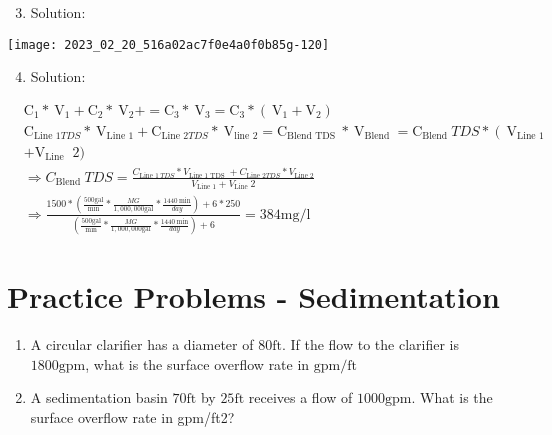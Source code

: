 \documentclass[10pt]{article}
\begin{document}
\begin{enumerate}
\begin{enumerate}
\begin{enumerate}
  \setcounter{enumi}{2}
  \item Solution:
\end{enumerate}

\begin{center}
\texttt{[image: 2023\_02\_20\_516a02ac7f0e4a0f0b85g-120]}
\end{center}

\begin{enumerate}
  \setcounter{enumi}{3}
  \item Solution:
\end{enumerate}

$$
\begin{aligned}
& \mathrm{C}_{1} * \mathrm{~V}_{1}+\mathrm{C}_{2} * \mathrm{~V}_{2}+=\mathrm{C}_{3} * \mathrm{~V}_{3}=\mathrm{C}_{3} *\left(\mathrm{~V}_{1}+\mathrm{V}_{2}\right) \\
& \mathrm{C}_{\text {Line } 1 T D S} * \mathrm{~V}_{\text {Line } 1}+\mathrm{C}_{\text {Line } 2 T D S} * \mathrm{~V}_{\text {line } 2}=\mathrm{C}_{\text {Blend TDS }} * \mathrm{~V}_{\text {Blend }}=\mathrm{C}_{\text {Blend }} T D S *\left(\mathrm{~V}_{\text {Line } 1}\right. \\
& +\mathrm{V}_{\text {Line }} \text { 2) } \\
& \Longrightarrow C_{\text {Blend }} T D S=\frac{C_{\text {Line } 1 ~ T D S} * V_{\text {Line 1 TDS }}+C_{\text {Line } 2 T D S} * V_{\text {Line } 2}}{V_{\text {Line } 1}+V_{\text {Line }} 2} \\
& \Longrightarrow \frac{1500 *\left(\frac{500 \mathrm{gal}}{\mathrm{min}} * \frac{M G}{1,000,000 \mathrm{gal}} * \frac{1440 \mathrm{~min}}{d a y}\right)+6 * 250}{\left(\frac{500 \mathrm{gal}}{\mathrm{min}} * \frac{M G}{1,000,000 \mathrm{gal}} * \frac{1440 \mathrm{~min}}{d a y}\right)+6}=384 \mathrm{mg} / \mathrm{l}
\end{aligned}
$$

\section{Practice Problems - Sedimentation}
\begin{enumerate}
  \item A circular clarifier has a diameter of $80 \mathrm{ft}$. If the flow to the clarifier is $1800 \mathrm{gpm}$, what is the surface overflow rate in $\mathrm{gpm} / \mathrm{ft}$

  \item A sedimentation basin $70 \mathrm{ft}$ by $25 \mathrm{ft}$ receives a flow of $1000 \mathrm{gpm}$. What is the surface overflow rate in gpm/ft2?


\end{enumerate}
\end{enumerate}
\end{enumerate}
\end{document}
